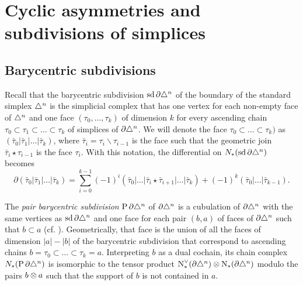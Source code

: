
\section{Cyclic asymmetries and subdivisions of simplices}\label{section:atlast}

\subsection{Barycentric subdivisions}\label{s:assembly}

Recall that the barycentric subdivision $\operatorname{sd} \partial\triangle^n$ of the boundary of the standard simplex $\triangle^n$ is the simplicial complex that has one vertex for each non-empty face of $\triangle^n$ and one face $(\tau_0,\dots,\tau_k)$ of dimension $k$ for every ascending chain $\tau_0 \subset \tau_1\subset\dots \subset \tau_k$ of simplices of $\partial \triangle^n$. We will denote the face $\tau_0 \subset \dots \subset \tau_k)$ as $(\bar{\tau}_0|\bar{\tau}_1|\dots|\bar{\tau}_k)$, where $\bar{\tau}_i = \tau_i\smallsetminus \tau_{i-1}$ is the face such that the geometric join $\bar{\tau}_i\star \tau_{i-1}$ is the face $\tau_i$. With this notation, the differential on $N_{*}(\operatorname{sd} \partial \triangle^n)$ becomes
\[
\partial(\bar{\tau}_0|\bar{\tau}_1|\dots|\bar{\tau}_k) = \sum_{i=0}^{k-1} (-1)^i(\bar{\tau}_0|\dots|\bar{\tau}_i\star \bar{\tau}_{i+1}|\dots |\bar{\tau}_k) + (-1)^k (\bar{\tau}_0|\dots|\bar{\tau}_{k-1}).
\]

The \emph{pair barycentric subdivision} $\operatorname{P} \partial\triangle^n$ of $\partial \triangle^n$ is a cubulation of $\partial \triangle^n$ with the same vertices as $\operatorname{sd} \partial \triangle^n$ and one face for each pair $(b,a)$ of faces of $\partial\triangle^n$ such that $b \subset a$ (cf. \cite{Rounds2010}). Geometrically, that face is the union of all the faces of dimension $|a|-|b|$ of the barycentric subdivision that correspond to ascending chains $b = \tau_0 \subset \dots \subset \tau_k= a$. Interpreting $b$ as a dual cochain, its chain complex $N_{*}(\operatorname{P} \partial\triangle^n)$ is isomorphic to the tensor product $\operatorname{N}^\vee_{*}(\partial\triangle^n) \otimes \operatorname{N}_{*}(\partial\triangle^n)$ modulo the pairs $b \otimes a$ such that the support of $b$ is not contained in $a$.

